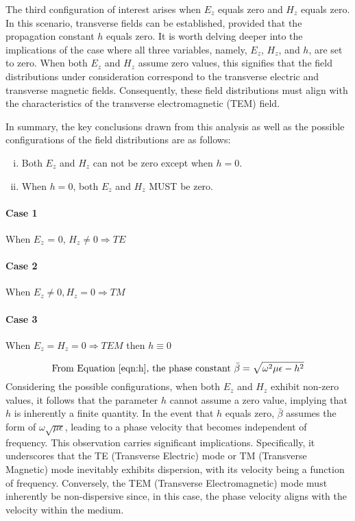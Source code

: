 The third configuration of interest arises when $E_z$ equals zero and $H_z$ equals zero. In this scenario, transverse fields can be established, provided that the propagation constant $h$ equals zero. It is worth delving deeper into the implications of the case where all three variables, namely, $E_z$, $H_z$, and $h$, are set to zero. When both $E_z$ and $H_z$ assume zero values, this signifies that the field distributions under consideration correspond to the transverse electric and transverse magnetic fields. Consequently, these field distributions must align with the characteristics of the transverse electromagnetic (TEM) field.

In summary, the key conclusions drawn from this analysis as well as the possible configurations of the field distributions are as follows:
\begin{enumerate}[(i)]
\item Both $E_z$ and $H_z$ can not be zero except when $h=0$.
\item When $h=0$, both $E_z$ and $H_z$ MUST be zero.
\end{enumerate}
\paragraph{Case 1}When $E_z$ = 0, $H_z \neq 0 \Rightarrow TE$
\paragraph{Case 2}When $E_z \neq 0, H_z = 0 \Rightarrow TM$
\paragraph{Case 3}When $E_z = H_z = 0 \Rightarrow TEM$ then $h \equiv 0$

\begin{dmath*}
\text{From Equation~\eqref{eqn:h}, the phase constant }\bar{\beta} = \sqrt{\omega^2\mu\epsilon - h^2}
\end{dmath*}
Considering the possible configurations, when both $E_z$ and $H_z$ exhibit non-zero values, it follows that the parameter $h$ cannot assume a zero value, implying that $h$ is inherently a finite quantity. In the event that $h$ equals zero, $\bar{\beta}$ assumes the form of $\omega \sqrt{\mu\epsilon}$, leading to a phase velocity that becomes independent of frequency. This observation carries significant implications. Specifically, it underscores that the TE (Transverse Electric) mode or TM (Transverse Magnetic) mode inevitably exhibits dispersion, with its velocity being a function of frequency. Conversely, the TEM (Transverse Electromagnetic) mode must inherently be non-dispersive since, in this case, the phase velocity aligns with the velocity within the medium.

